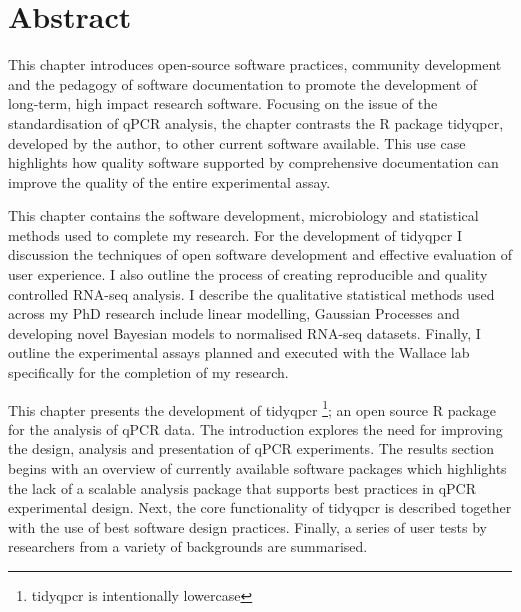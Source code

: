 \documentclass[../main.tex]{subfiles}
\begin{document}
\chapter{Abstract}

This chapter introduces open-source software practices, community development and the pedagogy of software documentation to promote the development of long-term, high impact research software. Focusing on the issue of the standardisation of qPCR analysis, the chapter contrasts the R package tidyqpcr, developed by the author, to other current software available. This use case highlights how quality software supported by comprehensive documentation can improve the quality of the entire experimental assay.

This chapter contains the software development, microbiology and statistical methods used to complete my research. For the development of tidyqpcr I discussion the techniques of open software development and effective evaluation of user experience. I also outline the process of creating reproducible and quality controlled RNA-seq analysis. I describe the qualitative statistical methods used across my PhD research include linear modelling, Gaussian Processes and developing novel Bayesian models to normalised RNA-seq datasets. Finally, I outline the experimental assays planned and executed with the Wallace lab specifically for the completion of my research. 

This chapter presents the development of tidyqpcr \footnote{tidyqpcr is intentionally lowercase}; an open source R package for the analysis of qPCR data.
The introduction explores the need for improving the design, analysis and presentation of qPCR experiments.
The results section begins with an overview of currently available software packages which highlights the lack of a scalable analysis package that supports best practices in qPCR experimental design.
Next, the core functionality of tidyqpcr is described together with the use of best software design practices.
Finally, a series of user tests by researchers from a variety of backgrounds are summarised.
\end{document}
